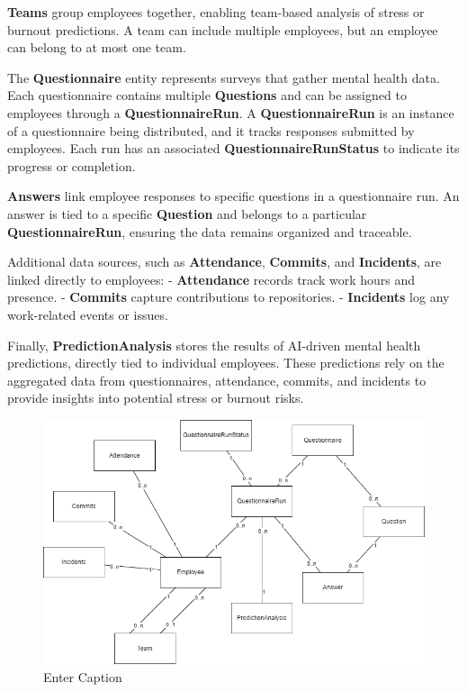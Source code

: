 \documentclass[conference]{IEEEtran}
\begin{document}
                \textbf{Teams} group employees together, enabling team-based analysis of stress or burnout predictions. A team can include multiple employees, but an employee can belong to at most one team.
                
                The \textbf{Questionnaire} entity represents surveys that gather mental health data. Each questionnaire contains multiple \textbf{Questions} and can be assigned to employees through a \textbf{QuestionnaireRun}. A \textbf{QuestionnaireRun} is an instance of a questionnaire being distributed, and it tracks responses submitted by employees. Each run has an associated \textbf{QuestionnaireRunStatus} to indicate its progress or completion.
                
                \textbf{Answers} link employee responses to specific questions in a questionnaire run. An answer is tied to a specific \textbf{Question} and belongs to a particular \textbf{QuestionnaireRun}, ensuring the data remains organized and traceable.
                
                Additional data sources, such as \textbf{Attendance}, \textbf{Commits}, and \textbf{Incidents}, are linked directly to employees:
                - \textbf{Attendance} records track work hours and presence.
                - \textbf{Commits} capture contributions to repositories.
                - \textbf{Incidents} log any work-related events or issues.
                
                Finally, \textbf{PredictionAnalysis} stores the results of AI-driven mental health predictions, directly tied to individual employees. These predictions rely on the aggregated data from questionnaires, attendance, commits, and incidents to provide insights into potential stress or burnout risks.

                \begin{figure}
                    \centering
                    \includegraphics[width=1\linewidth]{DiagramEntityRelationship.drawio.png}
                    \caption{Enter Caption}
                    \label{fig:enter-label}
                \end{figure}
\end{document}
